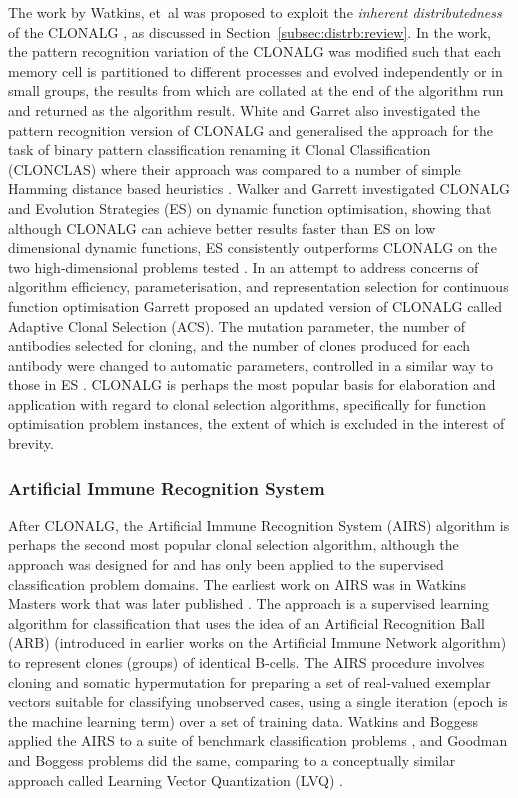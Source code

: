 The work by Watkins, et~al was proposed to exploit the \emph{inherent distributedness} of the CLONALG \cite{Watkins2003}, as discussed in Section~\ref{subsec:distrb:review}. In the work, the pattern recognition variation of the CLONALG was modified such that each memory cell is partitioned to different processes and evolved independently or in small groups, the results from which are collated at the end of the algorithm run and returned as the algorithm result. White and Garret also investigated the pattern recognition version of CLONALG and generalised the approach for the task of binary pattern classification renaming it Clonal Classification (CLONCLAS) where their approach was compared to a number of simple Hamming distance based heuristics \cite{White2003}. Walker and Garrett investigated CLONALG and Evolution Strategies (ES) on dynamic function optimisation, showing that although CLONALG can achieve better results faster than ES on low dimensional dynamic functions, ES consistently outperforms CLONALG on the two high-dimensional problems tested \cite{Walker2003}. In an attempt to address concerns of algorithm efficiency, parameterisation, and representation selection for continuous function optimisation Garrett proposed an updated version of CLONALG called Adaptive Clonal Selection (ACS). The mutation parameter, the number of antibodies selected for cloning, and the number of clones produced for each antibody were changed to automatic parameters, controlled in a similar way to those in ES  \cite{Garrett2004}.
CLONALG is perhaps the most popular basis for elaboration and application with regard to clonal selection algorithms, specifically for function optimisation problem instances, the extent of which is excluded in the interest of brevity.

%
%
\subsubsection{Artificial Immune Recognition System}
\label{subsubsec:cs:taxonomy:airs}
After CLONALG, the Artificial Immune Recognition System (AIRS) algorithm is perhaps the second most popular clonal selection algorithm, although the approach was designed for and has only been applied to the supervised classification problem domains. The earliest work on AIRS was in Watkins Masters work \cite{Watkins2001} that was later published \cite{Watkins2002a}. The approach is a supervised learning algorithm for classification that uses the idea of an Artificial Recognition Ball (ARB) (introduced in earlier works on the Artificial Immune Network algorithm) to represent clones (groups) of identical B-cells. The AIRS procedure involves cloning and somatic hypermutation for preparing a set of real-valued exemplar vectors suitable for classifying unobserved cases, using a single iteration (epoch is the machine learning term) over a set of training data. Watkins and Boggess applied the AIRS to a suite of benchmark classification problems \cite{Watkins2002}, and Goodman and Boggess problems did the same, comparing to a conceptually similar approach called Learning Vector Quantization (LVQ) \cite{Goodman2002}.

